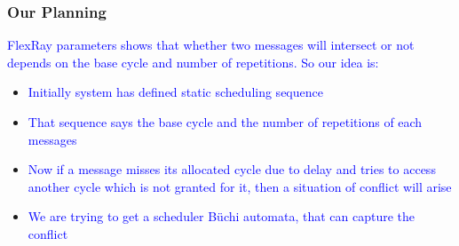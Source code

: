 \begin{frame}
\frametitle{ Our Planning }
\tiny{\textcolor{blue} {FlexRay parameters shows that whether two messages will intersect or not
depends on the base cycle and number of repetitions. So our idea is:}}
\begin{itemize}
\item \tiny{\textcolor{blue} {Initially system has defined static scheduling sequence}}
\item \tiny{\textcolor{blue} {That sequence says the base cycle and the number of repetitions of each messages}}
\item \tiny{\textcolor{blue} {Now if a message misses its allocated cycle due to delay and tries to access another cycle which is 
      not granted for it, then a situation of conflict will arise}}
\item \tiny{\textcolor{blue} {We are trying to get a scheduler B\"{u}chi automata, that can capture the conflict}}
       
\end{itemize}


\end{frame}